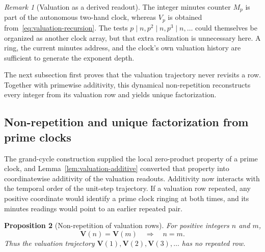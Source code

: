 \documentclass[11pt,a4paper]{article}
\theoremstyle{clockplain}
\newtheorem{proposition}{Proposition}
\theoremstyle{definition}
\theoremstyle{remark}
\newtheorem{remark}[proposition]{Remark}
\newcommand{\V}{\mathbf V}
\begin{document}
\begin{remark}[Valuation as a derived readout]
The integer minutes counter $M_p$ is part of the autonomous two-hand clock, whereas $V_p$ is obtained from~\eqref{eq:valuation-recursion}. The tests $p\mid n,p^2\mid n,p^3\mid n,\ldots$ could themselves be organized as another clock array, but that extra realization is unnecessary here. A ring, the current minutes address, and the clock's own valuation history are sufficient to generate the exponent depth.
\end{remark}

The next subsection first proves that the valuation trajectory never revisits a row. Together with primewise additivity, this dynamical non-repetition reconstructs every integer from its valuation row and yields unique factorization.

\subsection{Non-repetition and unique factorization from prime clocks}
\label{sec:clock-fta}

The grand-cycle construction supplied the local zero-product property of a prime clock, and Lemma~\ref{lem:valuation-additive} converted that property into coordinatewise additivity of the valuation readouts. Additivity now interacts with the temporal order of the unit-step trajectory. If a valuation row repeated, any positive coordinate would identify a prime clock ringing at both times, and its minutes readings would point to an earlier repeated pair.

\begin{proposition}[Non-repetition of valuation rows]
\label{prop:valuation-nonrepetition}
For positive integers $n$ and $m$,
\begin{equation}
\V(n)=\V(m)\quad\Longrightarrow\quad n=m.
\label{eq:valuation-injective}
\end{equation}
Thus the valuation trajectory $\V(1),\V(2),\V(3),\ldots$ has no repeated row.
\end{proposition}
\end{document}
